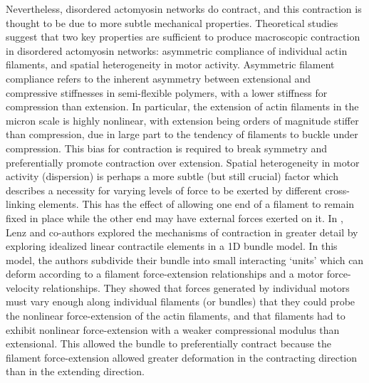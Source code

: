Nevertheless, disordered actomyosin networks do contract, and this contraction is thought to be due to more subtle mechanical properties.  Theoretical studies suggest that two key properties are sufficient to produce macroscopic contraction in disordered actomyosin networks:  asymmetric compliance of individual actin filaments, and spatial heterogeneity in motor activity.\cite{1367-2630-14-3-033037,PhysRevX.4.041002}   Asymmetric filament compliance refers to the inherent asymmetry between extensional and compressive stiffnesses in semi-flexible polymers, with a lower stiffness for compression than extension.  In particular, the extension of actin filaments in the micron scale is highly nonlinear, with extension being orders of magnitude stiffer than compression\cite{megareview}, due in large part to the tendency of filaments to buckle under compression\cite{PhysRevLett.108.238107}.  This bias for contraction is required to break symmetry and preferentially promote contraction over extension.  Spatial heterogeneity in motor activity (dispersion) is perhaps a more subtle (but still crucial) factor which describes a necessity for varying levels of force to be exerted by different cross-linking elements. This has the effect of allowing one end of a filament to remain fixed in place while the other end may have external forces exerted on it.  In \cite{1367-2630-14-3-033037}, Lenz and co-authors explored the mechanisms of contraction in greater detail by exploring idealized linear contractile elements in a 1D bundle model.  In this model, the authors subdivide their bundle into small interacting ‘units’ which can deform according to a filament force-extension relationships and a motor force-velocity relationships. They showed that forces generated by individual motors must  vary enough along individual filaments (or bundles) that they could probe the nonlinear force-extension of the actin filaments, and that filaments had to exhibit nonlinear force-extension with a weaker compressional modulus than extensional.  This allowed the bundle to preferentially contract because the filament force-extension allowed greater deformation in the contracting direction than in the extending direction.

